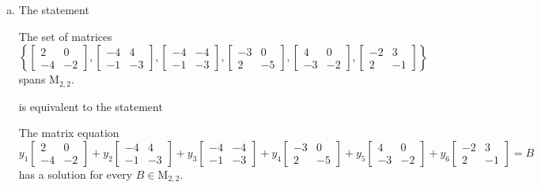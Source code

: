 \begin{exerciseAnswer}
\begin{enumerate}[(a)]
\item The statement 
\begin{center}\begin{minipage}{0.8\textwidth}
 The set of matrices \( \left\{ \left[\begin{array}{cc}
2 & 0 \\
-4 & -2
\end{array}\right] , \left[\begin{array}{cc}
-4 & 4 \\
-1 & -3
\end{array}\right] , \left[\begin{array}{cc}
-4 & -4 \\
-1 & -3
\end{array}\right] , \left[\begin{array}{cc}
-3 & 0 \\
2 & -5
\end{array}\right] , \left[\begin{array}{cc}
4 & 0 \\
-3 & -2
\end{array}\right] , \left[\begin{array}{cc}
-2 & 3 \\
2 & -1
\end{array}\right] \right\} \) spans \(\mathrm{M}_{2,2}\). 
\end{minipage}\end{center}
     is equivalent to the statement 
\begin{center}\begin{minipage}{0.8\textwidth}
 The matrix equation \[ y_{1} \left[\begin{array}{cc}
2 & 0 \\
-4 & -2
\end{array}\right] + y_{2} \left[\begin{array}{cc}
-4 & 4 \\
-1 & -3
\end{array}\right] + y_{3} \left[\begin{array}{cc}
-4 & -4 \\
-1 & -3
\end{array}\right] + y_{4} \left[\begin{array}{cc}
-3 & 0 \\
2 & -5
\end{array}\right] + y_{5} \left[\begin{array}{cc}
4 & 0 \\
-3 & -2
\end{array}\right] + y_{6} \left[\begin{array}{cc}
-2 & 3 \\
2 & -1
\end{array}\right] =B\] has a solution for every \(B \in \mathrm{M}_{2,2}\). 
\end{minipage}\end{center}
    

\end{enumerate}
\end{exerciseAnswer}
